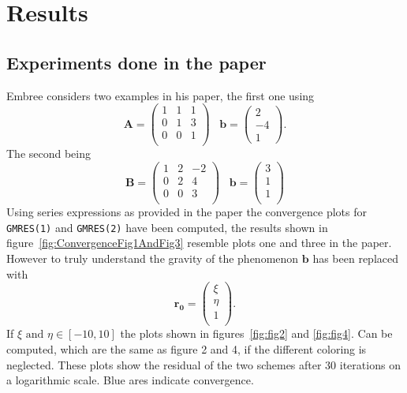 \section{Results}
\subsection{Experiments done in the paper}
Embree considers two examples in his paper, the first one using
\begin{equation}
\mathbf{A} = \begin{pmatrix}
1 & 1 & 1 \\
0 & 1 & 3 \\
0 & 0 & 1 \\
\end{pmatrix}
\;\;\; 
\mathbf{b} = \begin{pmatrix}
2 \\ -4 \\ 1
\end{pmatrix}.
\end{equation}
The second being
\begin{equation}
\mathbf{B} =
\begin{pmatrix}
1 & 2 & -2 \\
0 & 2 & 4 \\
0 & 0 & 3 \\
\end{pmatrix}
\;\;\;
\mathbf{b} =
\begin{pmatrix}
3 \\
1 \\
1 \\
\end{pmatrix}
\end{equation}
Using series expressions as provided in the paper the convergence plots for \texttt{GMRES(1)} and \texttt{GMRES(2)} have been computed, the results shown in figure~\ref{fig:ConvergenceFig1AndFig3} resemble plots one and three in the paper. However to truly understand the gravity of the phenomenon $\mathbf{b}$ has been replaced with 
\begin{equation}
\mathbf{r_0} = \begin{pmatrix}
\xi \\ \eta \\ 1 \\
\end{pmatrix}.
\end{equation}
If $\xi \text{ and } \eta \in [-10,10]$ the plots shown in figures~\ref{fig:fig2} and \ref{fig:fig4}. Can be computed, which are the same as figure 2 and 4, if the different coloring is neglected. These plots show the residual of the two schemes after 30 iterations on a logarithmic scale. Blue ares indicate convergence. 


